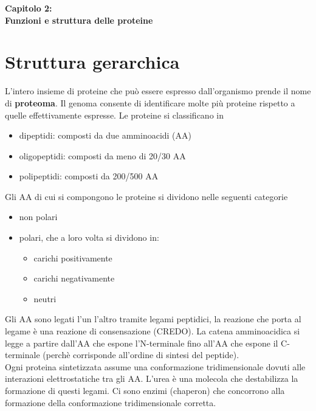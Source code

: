 \Large\textbf{Capitolo 2: \\ Funzioni e struttura delle proteine}

\section{Struttura gerarchica}
    \small
    L'intero insieme di proteine che può essere espresso dall'organismo prende il nome di \textbf{proteoma}. Il genoma consente di identificare molte più proteine rispetto a quelle effettivamente espresse.
    Le proteine si classificano in 
    \begin{itemize}
        \item dipeptidi: composti da due amminoacidi (AA)
        \item oligopeptidi: composti da meno di 20/30 AA
        \item polipeptidi: composti da 200/500 AA 
    \end{itemize}
    Gli AA di cui si compongono le proteine si dividono nelle seguenti categorie 
    \begin{itemize}
        \item non polari
        \item polari, che a loro volta si dividono in: 
        \begin{itemize}
            \item carichi positivamente
            \item carichi negativamente
            \item neutri
        \end{itemize}
    \end{itemize}
    Gli AA sono legati l'un l'altro tramite legami peptidici, la reazione che porta al legame è una reazione di consensazione (CREDO). La catena amminoacidica si legge a partire dall'AA che espone l'N-terminale fino all'AA che espone il C-terminale (perchè corrisponde all'ordine di sintesi del peptide).\\
    Ogni proteina sintetizzata assume una conformazione tridimensionale dovuti alle interazioni elettrostatiche tra gli AA. L'urea è una molecola che destabilizza la formazione di questi legami. Ci sono enzimi (chaperon) che concorrono alla formazione della conformazione tridimensionale corretta.
    
